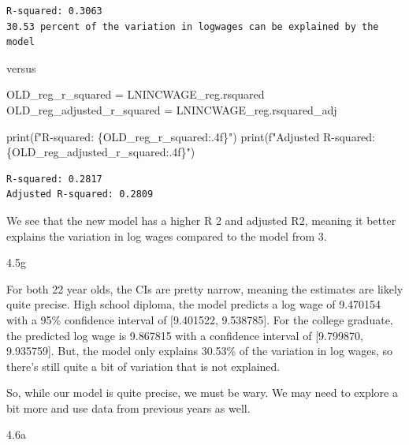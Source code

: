 \documentclass[
  11pt,
  letterpaper,
  DIV=11,
  numbers=noendperiod]{scrartcl}
\newenvironment{Shaded}{\begin{snugshade}}{\end{snugshade}}
\newcommand{\BuiltInTok}[1]{\textcolor[rgb]{0.00,0.23,0.31}{#1}}
\newcommand{\NormalTok}[1]{\textcolor[rgb]{0.00,0.23,0.31}{#1}}
\newcommand{\OperatorTok}[1]{\textcolor[rgb]{0.37,0.37,0.37}{#1}}
\newcommand{\SpecialCharTok}[1]{\textcolor[rgb]{0.37,0.37,0.37}{#1}}
\newcommand{\SpecialStringTok}[1]{\textcolor[rgb]{0.13,0.47,0.30}{#1}}
\begin{document}
\begin{verbatim}
R-squared: 0.3063
30.53 percent of the variation in logwages can be explained by the model
\end{verbatim}

versus

\begin{Shaded}
\begin{Highlighting}[]
\NormalTok{OLD\_reg\_r\_squared }\OperatorTok{=}\NormalTok{ LNINCWAGE\_reg.rsquared}
\NormalTok{OLD\_reg\_adjusted\_r\_squared }\OperatorTok{=}\NormalTok{ LNINCWAGE\_reg.rsquared\_adj}

\BuiltInTok{print}\NormalTok{(}\SpecialStringTok{f"R{-}squared: }\SpecialCharTok{\{}\NormalTok{OLD\_reg\_r\_squared}\SpecialCharTok{:.4f\}}\SpecialStringTok{"}\NormalTok{)}
\BuiltInTok{print}\NormalTok{(}\SpecialStringTok{f"Adjusted R{-}squared: }\SpecialCharTok{\{}\NormalTok{OLD\_reg\_adjusted\_r\_squared}\SpecialCharTok{:.4f\}}\SpecialStringTok{"}\NormalTok{)}
\end{Highlighting}
\end{Shaded}

\begin{verbatim}
R-squared: 0.2817
Adjusted R-squared: 0.2809
\end{verbatim}

We see that the new model has a higher R 2 and adjusted R2, meaning it
better explains the variation in log wages compared to the model from 3.

4.5g

For both 22 year olds, the CIs are pretty narrow, meaning the estimates
are likely quite precise. High school diploma, the model predicts a log
wage of 9.470154 with a 95\% confidence interval of {[}9.401522,
9.538785{]}. For the college graduate, the predicted log wage is
9.867815 with a confidence interval of {[}9.799870, 9.935759{]}. But,
the model only explains 30.53\% of the variation in log wages, so
there's still quite a bit of variation that is not explained.

So, while our model is quite precise, we must be wary. We may need to
explore a bit more and use data from previous years as well.

4.6a
\end{document}

